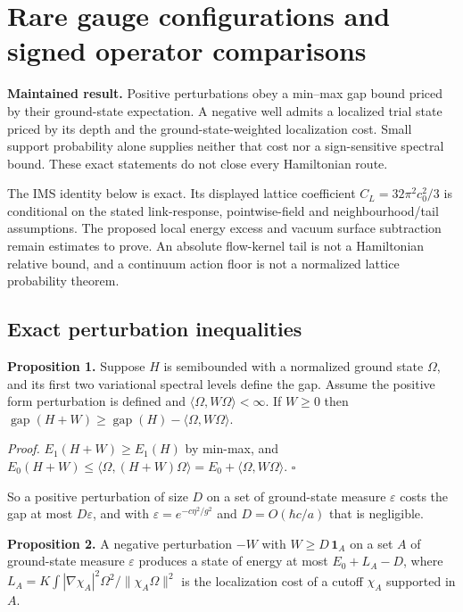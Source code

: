 \documentclass[11pt,a4paper]{article}
\begin{document}
\hypertarget{rare-gauge-configurations-and-signed-operator-comparisons}{%
\section{Rare gauge configurations and signed operator
comparisons}\label{rare-gauge-configurations-and-signed-operator-comparisons}}

\textbf{Maintained result.} Positive perturbations obey a min--max gap
bound priced by their ground-state expectation. A negative well admits a
localized trial state priced by its depth and the ground-state-weighted
localization cost. Small support probability alone supplies neither that
cost nor a sign-sensitive spectral bound. These exact statements do not
close every Hamiltonian route.

The IMS identity below is exact. Its displayed lattice coefficient
\(C_L=32\pi^2c_0^2/3\) is conditional on the stated link-response,
pointwise-field and neighbourhood/tail assumptions. The proposed local
energy excess and vacuum surface subtraction remain estimates to prove.
An absolute flow-kernel tail is not a Hamiltonian relative bound, and a
continuum action floor is not a normalized lattice probability theorem.

\hypertarget{exact-perturbation-inequalities}{%
\subsection{Exact perturbation
inequalities}\label{exact-perturbation-inequalities}}

\textbf{Proposition 1.} Suppose \(H\) is semibounded with a normalized
ground state \(\Omega\), and its first two variational spectral levels
define the gap. Assume the positive form perturbation is defined and
\(\langle\Omega,W\Omega\rangle<\infty\). If \(W\ge0\) then
\(\operatorname{gap}(H+W)\ge\operatorname{gap}(H)-\langle\Omega,W\Omega\rangle\).

\emph{Proof.} \(E_1(H+W)\ge E_1(H)\) by min-max, and
\(E_0(H+W)\le\langle\Omega,(H+W)\Omega\rangle=E_0+\langle\Omega,W\Omega\rangle\).
\(\square\)

So a positive perturbation of size \(D\) on a set of ground-state
measure \(\varepsilon\) costs the gap at most \(D\varepsilon\), and with
\(\varepsilon=e^{-c\eta^2/g^2}\) and \(D=O(\hbar c/a)\) that is
negligible.

\textbf{Proposition 2.} A negative perturbation \(-W\) with
\(W\ge D\,\mathbf 1_A\) on a set \(A\) of ground-state measure
\(\varepsilon\) produces a state of energy at most \(E_0+L_A-D\), where
\(L_A=K\int|\nabla\chi_A|^2\Omega^2/\|\chi_A\Omega\|^2\) is the
localization cost of a cutoff \(\chi_A\) supported in \(A\).
\end{document}
